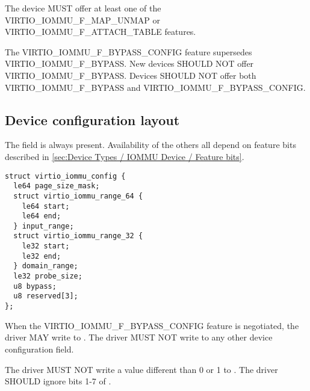 
The device MUST offer at least one of the
VIRTIO_IOMMU_F_MAP_UNMAP or VIRTIO_IOMMU_F_ATTACH_TABLE features.

The VIRTIO_IOMMU_F_BYPASS_CONFIG feature supersedes
VIRTIO_IOMMU_F_BYPASS. New devices SHOULD NOT offer
VIRTIO_IOMMU_F_BYPASS. Devices SHOULD NOT offer both
VIRTIO_IOMMU_F_BYPASS and VIRTIO_IOMMU_F_BYPASS_CONFIG.

\subsection{Device configuration layout}\label{sec:Device Types / IOMMU Device / Device configuration layout}

The  field is always present. Availability of the
others all depend on feature bits described in
\ref{sec:Device Types / IOMMU Device / Feature bits}.

\begin{lstlisting}
struct virtio_iommu_config {
  le64 page_size_mask;
  struct virtio_iommu_range_64 {
    le64 start;
    le64 end;
  } input_range;
  struct virtio_iommu_range_32 {
    le32 start;
    le32 end;
  } domain_range;
  le32 probe_size;
  u8 bypass;
  u8 reserved[3];
};
\end{lstlisting}


When the VIRTIO_IOMMU_F_BYPASS_CONFIG feature is negotiated, the
driver MAY write to . The driver MUST NOT write to
any other device configuration field.

The driver MUST NOT write a value different than 0 or 1 to
. The driver SHOULD ignore bits 1-7 of
.


